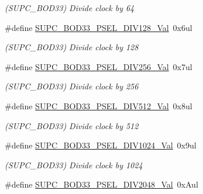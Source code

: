\begin{DoxyCompactItemize}
\begin{DoxyCompactList}\small\item\em (S\+U\+P\+C\+\_\+\+B\+O\+D33) Divide clock by 64 \end{DoxyCompactList}\item 
\hypertarget{group___s_a_m_l21___s_u_p_c_gad1c45a9c7423dd4967f6e0f68ee33383}{}\#define \hyperlink{group___s_a_m_l21___s_u_p_c_gad1c45a9c7423dd4967f6e0f68ee33383}{S\+U\+P\+C\+\_\+\+B\+O\+D33\+\_\+\+P\+S\+E\+L\+\_\+\+D\+I\+V128\+\_\+\+Val}~0x6ul\label{group___s_a_m_l21___s_u_p_c_gad1c45a9c7423dd4967f6e0f68ee33383}

\begin{DoxyCompactList}\small\item\em (S\+U\+P\+C\+\_\+\+B\+O\+D33) Divide clock by 128 \end{DoxyCompactList}\item 
\hypertarget{group___s_a_m_l21___s_u_p_c_ga446e919241877b5edb121c7cd614ba1a}{}\#define \hyperlink{group___s_a_m_l21___s_u_p_c_ga446e919241877b5edb121c7cd614ba1a}{S\+U\+P\+C\+\_\+\+B\+O\+D33\+\_\+\+P\+S\+E\+L\+\_\+\+D\+I\+V256\+\_\+\+Val}~0x7ul\label{group___s_a_m_l21___s_u_p_c_ga446e919241877b5edb121c7cd614ba1a}

\begin{DoxyCompactList}\small\item\em (S\+U\+P\+C\+\_\+\+B\+O\+D33) Divide clock by 256 \end{DoxyCompactList}\item 
\hypertarget{group___s_a_m_l21___s_u_p_c_ga2230cd2fc2c3877a170c738dc57b3bab}{}\#define \hyperlink{group___s_a_m_l21___s_u_p_c_ga2230cd2fc2c3877a170c738dc57b3bab}{S\+U\+P\+C\+\_\+\+B\+O\+D33\+\_\+\+P\+S\+E\+L\+\_\+\+D\+I\+V512\+\_\+\+Val}~0x8ul\label{group___s_a_m_l21___s_u_p_c_ga2230cd2fc2c3877a170c738dc57b3bab}

\begin{DoxyCompactList}\small\item\em (S\+U\+P\+C\+\_\+\+B\+O\+D33) Divide clock by 512 \end{DoxyCompactList}\item 
\hypertarget{group___s_a_m_l21___s_u_p_c_gaa0f2c18f38e2ffcf4955812914e61e46}{}\#define \hyperlink{group___s_a_m_l21___s_u_p_c_gaa0f2c18f38e2ffcf4955812914e61e46}{S\+U\+P\+C\+\_\+\+B\+O\+D33\+\_\+\+P\+S\+E\+L\+\_\+\+D\+I\+V1024\+\_\+\+Val}~0x9ul\label{group___s_a_m_l21___s_u_p_c_gaa0f2c18f38e2ffcf4955812914e61e46}

\begin{DoxyCompactList}\small\item\em (S\+U\+P\+C\+\_\+\+B\+O\+D33) Divide clock by 1024 \end{DoxyCompactList}\item 
\hypertarget{group___s_a_m_l21___s_u_p_c_ga55e406301f6fd1b9abe16e95e351144d}{}\#define \hyperlink{group___s_a_m_l21___s_u_p_c_ga55e406301f6fd1b9abe16e95e351144d}{S\+U\+P\+C\+\_\+\+B\+O\+D33\+\_\+\+P\+S\+E\+L\+\_\+\+D\+I\+V2048\+\_\+\+Val}~0x\+Aul\label{group___s_a_m_l21___s_u_p_c_ga55e406301f6fd1b9abe16e95e351144d}


\end{DoxyCompactItemize}
